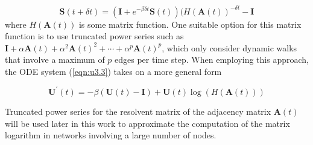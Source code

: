 \begin{equation}
\label{eqn:remarks1}
    \mathbf{S}(t + \delta t) = (\mathbf{I} + e^{-\beta\delta t}\mathbf{S}(t)) (H(\mathbf{A}(t))^{-\delta t} - \mathbf{I}
\end{equation}
where $H(\mathbf{A}(t))$ is some matrix function. One suitable option for this matrix function is to use truncated power series such as $\mathbf{I} + \alpha \mathbf{A}(t) + \alpha^2 \mathbf{A}(t)^2 + \cdots + \alpha^p \mathbf{A}(t)^p$, which only consider dynamic walks that involve a maximum of $p$ edges per time step. When employing this approach, the ODE system (\ref{eqn:u3.3}) takes on a more general form 

\begin{equation}
\label{eqn:remarks2}
    \mathbf{U^{\prime}}(t) = -\beta (\mathbf{U}(t) - \mathbf{I}) + \mathbf{U}(t)\log (H(\mathbf{A}(t)))
\end{equation}

Truncated power series for the resolvent matrix of the adjacency matrix $\mathbf{A}(t)$ will be used later in this work to approximate the computation of the matrix logarithm in networks involving a large number of nodes.








